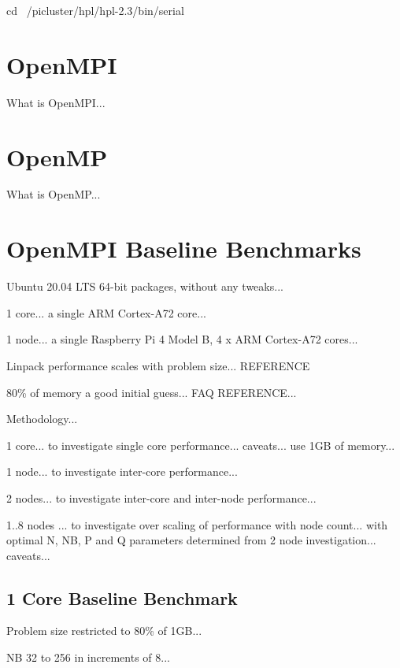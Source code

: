 \documentclass{article}
\begin{document}
cd ~/picluster/hpl/hpl-2.3/bin/serial



\section{OpenMPI}

What is OpenMPI...



\section{OpenMP}

What is OpenMP...



\section{OpenMPI Baseline Benchmarks}

Ubuntu 20.04 LTS 64-bit packages, without any tweaks...

1 core... a single ARM Cortex-A72 core...

1 node... a single Raspberry Pi 4 Model B, 4 x ARM Cortex-A72 cores...

Linpack performance scales with problem size... REFERENCE

80\% of memory a good initial guess... FAQ REFERENCE...


Methodology...

1 core... to investigate single core performance... caveats... use 1GB of memory...

1 node... to investigate inter-core performance...

2 nodes... to investigate inter-core and inter-node performance...

1..8 nodes ... to investigate over scaling of performance with node count... with optimal N, NB, P and Q parameters determined from 2 node investigation... caveats...



\subsection{1 Core Baseline Benchmark}

Problem size restricted to 80\% of 1GB...

NB 32 to 256 in increments of 8...
\end{document}
